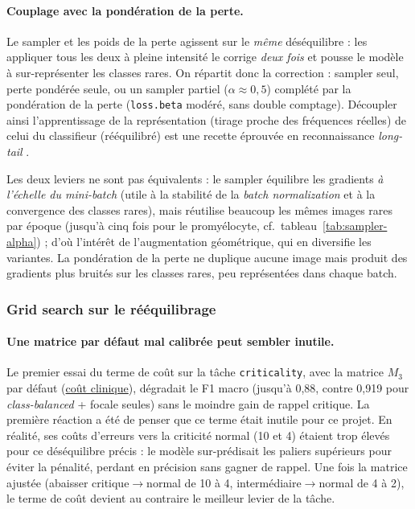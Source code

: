 \paragraph{Couplage avec la pondération de la perte.} 
Le sampler et les poids de la perte agissent sur le \emph{même} déséquilibre : les appliquer tous les deux à pleine intensité le corrige \emph{deux fois} et pousse le modèle à sur-représenter les classes rares. 
On répartit donc la correction : sampler seul, perte pondérée seule, ou un sampler partiel ($\alpha \approx 0{,}5$) complété par la pondération de la perte (\texttt{loss.beta} modéré, sans double comptage).
Découpler ainsi l’apprentissage de la représentation (tirage proche des fréquences réelles) de celui du classifieur (rééquilibré) est une recette éprouvée en reconnaissance \emph{long-tail} \parencite{kang2020decoupling}. 

Les deux leviers ne sont pas équivalents : le sampler équilibre les gradients \emph{à l’échelle du mini-batch} (utile à la stabilité de la \emph{batch normalization} et à la convergence des classes rares), mais réutilise beaucoup les mêmes images rares par époque (jusqu’à cinq fois pour le promyélocyte, cf.\ tableau~\ref{tab:sampler-alpha}) ; d’où l’intérêt de l’augmentation géométrique, qui en diversifie les variantes.
La pondération de la perte ne duplique aucune image mais produit des gradients plus bruités sur les classes rares, peu représentées dans chaque batch.

\subsubsection{Grid search sur le rééquilibrage}
\label{sec:grid-reequilibrage}

\paragraph{Une matrice par défaut mal calibrée peut sembler inutile.}
Le premier essai du terme de coût sur la tâche \texttt{criticality}, avec la matrice $M_3$ par défaut (\hyperref[sec:cout-clinique]{coût clinique}), dégradait le F1 macro (jusqu’à 0,88, contre 0,919 pour \emph{class-balanced} + focale seules) sans le moindre gain de rappel critique.
La première réaction a été de penser que ce terme était inutile pour ce projet.
En réalité, ses coûts d'erreurs vers la criticité normal (10 et 4) étaient trop élevés pour ce déséquilibre précis : le modèle sur-prédisait les paliers supérieurs pour éviter la pénalité, perdant en précision sans gagner de rappel. 
Une fois la matrice ajustée (abaisser critique$\to$normal de 10 à 4, intermédiaire$\to$normal de 4 à 2), le terme de coût devient au contraire le meilleur levier de la tâche. 

